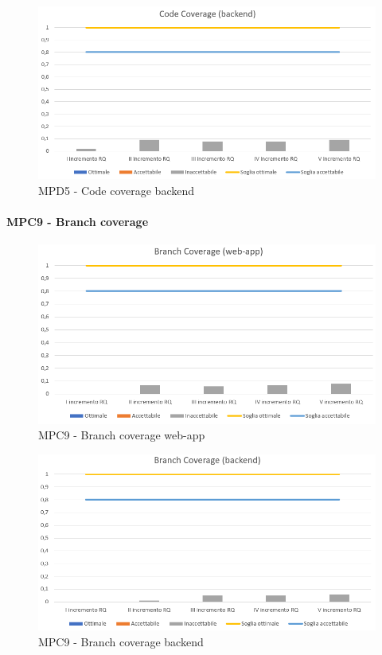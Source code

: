   \begin{figure}[h!]
    \centering
      \includegraphics[scale=1]{Immagini/CodeCov BE.PNG}
    \caption{MPD5 - Code coverage backend}
  \end{figure}


  \clearpage
  \paragraph{MPC9 - Branch coverage}
  \begin{figure}[h!]
    \centering
      \includegraphics[scale=1]{Immagini/BranchCov WA.PNG}
    \caption{MPC9 - Branch coverage web-app}
  \end{figure}

  \begin{figure}[h!]
    \centering
      \includegraphics[scale=1]{Immagini/BranchCov BE.PNG}
    \caption{MPC9 - Branch coverage backend}
  \end{figure}




